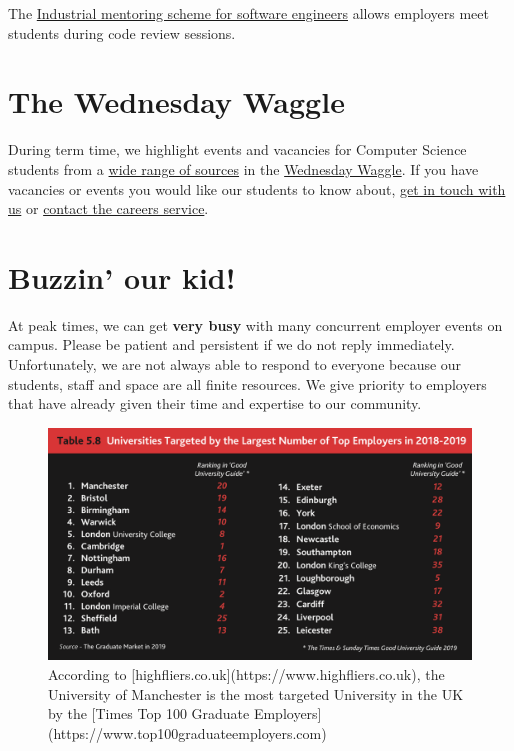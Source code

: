 \documentclass[12pt,]{book}
\begin{document}
The \href{https://www.cs.manchester.ac.uk/connect/business-engagement/industrial-mentoring/}{Industrial mentoring scheme for software engineers} allows employers meet students during code review sessions.

\hypertarget{the-wednesday-waggle}{%
\section{The Wednesday Waggle}\label{the-wednesday-waggle}}

During term time, we highlight events and vacancies for Computer Science students from a \href{http://dullhunk.github.io/where-can-I-look-for-jobs.html}{wide range of sources} in the \href{https://waggle.cs.manchester.ac.uk/waggle/about}{Wednesday Waggle}. If you have vacancies or events you would like our students to know about, \protect\hyperlink{contact}{get in touch with us} or \href{http://www.careers.manchester.ac.uk/aboutus/contact/}{contact the careers service}.

\hypertarget{buzzin-our-kid}{%
\section{Buzzin' our kid! 🐝}\label{buzzin-our-kid}}

At peak times, we can get \textbf{very busy} with many concurrent employer events on campus. Please be patient and persistent if we do not reply immediately. Unfortunately, we are not always able to respond to everyone because our students, staff and space are all finite resources. We give priority to employers that have already given their time and expertise to our community.

\begin{figure}

{\centering \includegraphics[width=1\linewidth]{images/high-fliers-table} 

}

\caption{According to [highfliers.co.uk](https://www.highfliers.co.uk), the University of Manchester is the most targeted University in the UK by the [Times Top 100 Graduate Employers](https://www.top100graduateemployers.com)}\label{fig:unnamed-chunk-5}
\end{figure}
\end{document}
